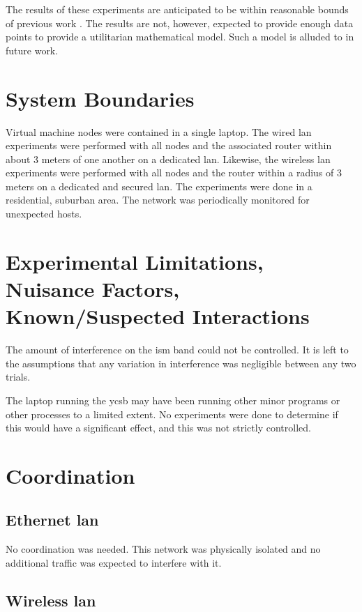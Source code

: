 The results of these experiments are anticipated to be within reasonable bounds of previous work \cite{Abramova2014}.  The results are not, however, expected to provide enough data points to provide a utilitarian mathematical model.  Such a model is alluded to in future work.

\section{System Boundaries}

Virtual machine nodes were contained in a single laptop.  The wired \gls{lan} experiments were performed with all nodes and the associated router within about 3 meters of one another on a dedicated \gls{lan}.  Likewise, the wireless \gls{lan} experiments were performed with all nodes and the router within a radius of 3 meters on a dedicated and secured \gls{lan}.  The experiments were done in a residential, suburban area. The network was periodically monitored for unexpected hosts.  

\section{Experimental Limitations, Nuisance Factors, Known/Suspected Interactions}

The amount of interference on the \gls{ism} band could not be controlled.  It is left to the assumptions that any variation in interference was negligible between any two trials.

The laptop running the \gls{ycsb} may have been running other minor programs or other processes to a limited extent.  No experiments were done to determine if this would have a significant effect, and this was not strictly controlled.

\section{Coordination}

\subsection{Ethernet \gls{lan}}

No coordination was needed.  This network was physically isolated and no additional traffic was expected to interfere with it.

\subsection{Wireless \gls{lan}}

